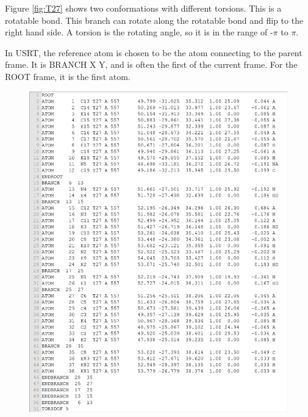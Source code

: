 \documentclass[twocolumn]{svjour3}          %
\begin{document}
Figure \ref{fig:T27} shows two conformations with different torsions. This is a rotatable bond. This branch can rotate along the rotatable bond and flip to the right hand side. A torsion is the rotating angle, so it is in the range of -$\pi$ to $\pi$. 

In USRT, the reference atom is chosen to be the atom connecting to the parent frame. It is BRANCH X Y, and is often the first of the current frame. For the ROOT frame, it is the first atom.

\begin{figure}
\centering
\includegraphics[width=1.36\textwidth,natwidth=1899,natheight=2350]{../usrt/T27CrystalPDBQT.png}
\endminipage
{}
\centering

\end{figure}
\end{document}
